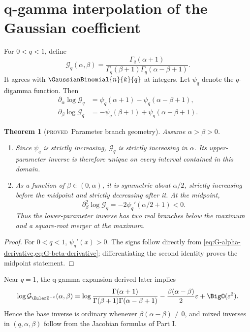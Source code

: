 \documentclass[11pt,letterpaper,oneside,openany]{book}
\newtheorem{theorem}{Theorem}[chapter]
\theoremstyle{definition}
\theoremstyle{remark}
\newcommand{\statusproved}{\textcolor{provedgreen}{\textsc{proved}}}
\begin{document}
\section{q-gamma interpolation of the Gaussian coefficient}
For \(0<q<1\), define
\begin{equation}
 \mathcal G_q(\alpha,\beta)=
 \frac{\Gamma_q(\alpha+1)}
 {\Gamma_q(\beta+1)\Gamma_q(\alpha-\beta+1)}.
 \label{eq:continuous-gaussian}
\end{equation}
It agrees with \(\GaussianBinomial{n}{k}{q}\) at integers.  Let \(\psi_q\) denote the
\(q\)-digamma function.  Then
\begin{align}
 \partial_\alpha\log\mathcal G_q
 &=\psi_q(\alpha+1)-\psi_q(\alpha-\beta+1), \label{eq:G-alpha-derivative}\\
 \partial_\beta\log\mathcal G_q
 &=-\psi_q(\beta+1)+\psi_q(\alpha-\beta+1).
 \label{eq:G-beta-derivative}
\end{align}

\begin{theorem}[\statusproved\ Parameter branch geometry]
Assume \(\alpha>\beta>0\).
\begin{enumerate}
\item Since \(\psi_q\) is strictly increasing, \(\mathcal G_q\) is strictly
increasing in \(\alpha\).  Its upper-parameter inverse is therefore unique on
every interval contained in this domain.
\item As a function of \(\beta\in(0,\alpha)\), it is symmetric about
\(\alpha/2\), strictly increasing before the midpoint and strictly decreasing
after it.  At the midpoint,
\[
 \partial_\beta^2\log\mathcal G_q
 =-2\psi_q'(\alpha/2+1)<0.
\]
Thus the lower-parameter inverse has two real branches below the maximum and a
square-root merger at the maximum.
\end{enumerate}
\end{theorem}
\begin{proof}
For \(0<q<1\), \(\psi_q'(x)>0\).  The signs follow directly from
\cref{eq:G-alpha-derivative,eq:G-beta-derivative}; differentiating the second
identity proves the midpoint statement.
\end{proof}

Near \(q=1\), the q-gamma expansion derived later implies
\begin{equation}
 \log\mathcal G_{\EulerE^{-\varepsilon}}(\alpha,\beta)
 =\log\frac{\Gamma(\alpha+1)}
 {\Gamma(\beta+1)\Gamma(\alpha-\beta+1)}
 -\frac{\beta(\alpha-\beta)}2\varepsilon+\BigO(\varepsilon^2).
 \label{eq:continuous-gaussian-q1}
\end{equation}
Hence the base inverse is ordinary whenever
\(\beta(\alpha-\beta)\ne0\), and mixed inverses in \((q,\alpha,\beta)\) follow
from the Jacobian formulas of Part I.
\end{document}
